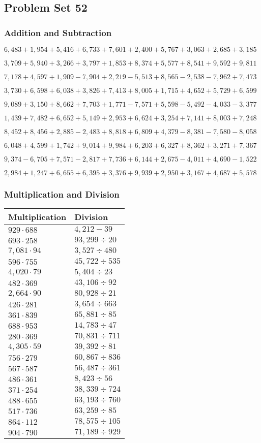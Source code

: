 \hypertarget{problem-set-52-2}{%
\subsection{Problem Set 52}\label{problem-set-52-2}}

\hypertarget{addition-and-subtraction-214}{%
\subsubsection{Addition and
Subtraction}\label{addition-and-subtraction-214}}

\(6,483+1,954+5,416+6,733+7,601+2,400+5,767+3,063+2,685+ 3,185\)

\(3,709+5,940+3,266+3,797+1,853+8,374+5,577+8,541+9,592+9,811\)

\(7,178+4,597+1,909-7,904+2,219-5,513+8,565-2,538-7,962+7,473\)

\(3,730+6,598+6,038+3,826+7,413+8,005+1,715+4,652+5,729+6,599\)

\(9,089+3,150+8,662+7,703+1,771-7,571+5,598-5,492-4,033-3,377\)

\(1,439+7,482+6,652+5,149+2,953+6,624+3,254+7,141+8,003+7,248\)

\(8,452+8,456+2,885-2,483+8,818+6,809+4,379-8,381-7,580-8,058\)

\(6,048+4,599+1,742+9,014+9,984+6,203+6,327+8,362+3,271+7,367\)

\(9,374-6,705+7,571-2,817+7,736+6,144+2,675-4,011+4,690-1,522\)

\(2,984+1,247+6,655+6,395+3,376+9,939+2,950+3,167+4,687+5,578\)

\hypertarget{multiplication-and-division-213}{%
\subsubsection{Multiplication and
Division}\label{multiplication-and-division-213}}

\begin{longtable}[]{@{}ll@{}}
\toprule
Multiplication & Division\tabularnewline
\midrule
\endhead
\(929\cdot688\) & \(4,212 - 39\)\tabularnewline
\(693\cdot258\) & \(93,299÷20\)\tabularnewline
\(7,081\cdot94\) & \(3,527÷480\)\tabularnewline
\(596\cdot755\) & \(45,722÷535\)\tabularnewline
\(4,020\cdot79\) & \(5,404÷23\)\tabularnewline
\(482\cdot369\) & \(43,106÷92\)\tabularnewline
\(2,664\cdot90\) & \(80,928÷21\)\tabularnewline
\(426\cdot281\) & \(3,654÷663\)\tabularnewline
\(361\cdot839\) & \(65,881÷85\)\tabularnewline
\(688\cdot953\) & \(14,783÷47\)\tabularnewline
\(280\cdot369\) & \(70,831÷711\)\tabularnewline
\(4,305\cdot59\) & \(39,392÷81\)\tabularnewline
\(756\cdot279\) & \(60,867÷836\)\tabularnewline
\(567\cdot587\) & \(56,487÷361\)\tabularnewline
\(486\cdot361\) & \(8,423÷56\)\tabularnewline
\(371\cdot254\) & \(38,339÷724\)\tabularnewline
\(488\cdot655\) & \(63,193÷760\)\tabularnewline
\(517\cdot736\) & \(63,259÷85\)\tabularnewline
\(864\cdot112\) & \(78,575÷105\)\tabularnewline
\(904\cdot790\) & \(71,189÷929\)\tabularnewline
\bottomrule
\end{longtable}

